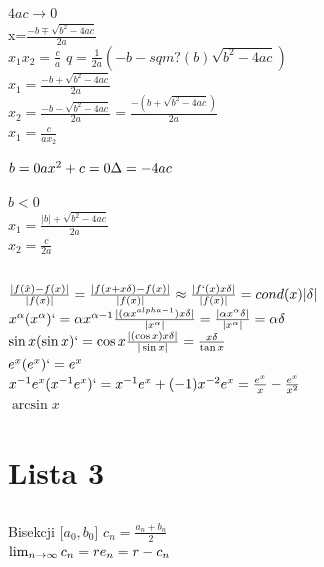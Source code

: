 \documentclass{article}
\begin{document}
    \subsection{}
    $4ac\rightarrow0$\\
    x=$\frac{-b\mp \sqrt{b^{2}-4ac}}{2a}$\\
    $x_{1}x_{2}=\frac{c}{a}$
    $q=\frac{1}{2a}(-b-sqm?(b)\sqrt{b^{2}-4ac})$\\
    $x_{1}=\frac{-b+\sqrt{b^{2}-4ac}}{2a}$\\
    $x_{2}=\frac{-b-\sqrt{b^{2}-4ac}}{2a}=\frac{-(b+\sqrt{b^{2}-4ac})}{2a}$\\
    $x_{1}=\frac{c}{ax_{2}}$\\
    \begin{flushright}
        \parbox{100mm}{
            $b=0    ax^{2}+c=0\\\Delta=-4ac$
        }
    \end{flushright}
    $b< 0 $\\
    $x_{1}=\frac{|b|+\sqrt{b^{2}-4ac}}{2a}$\\
    $x_{2}=\frac{c}{2a}$

    \setcounter{subsection}{7}

    \subsection{}
    $\frac{|f(\hat{x})-f(x)|}{|f(x)|}=\frac{|f(x+x\delta)-f(x)|}{|f(x)|}\approx \frac{|f`(x)x\delta|}{|f(x)|}=cond(x)|\delta|$\\
    $x^{\alpha}   (x^{\alpha})`=\alpha x^{\alpha-1}       \frac{|(\alpha x^{alpha-1})x\delta|}{|x^{\alpha}|}=\frac{|\alpha x^{\alpha}\delta|}{|x^{\alpha}|}=\alpha \delta$\\
    $\sin x (\sin x)`=\cos x      \frac{|(\cos x)x\delta|}{|\sin x|}=\frac{x\delta}{\tan x}$\\
    $e^{x} (e^{x})`=e^{x}$\\
    $x^{-1}e^{x} (x^{-1}e^{x})`=x^{-1}e^{x}+(-1)x^{-2}e^{x}=\frac{e^{x}}{x}-\frac{e^{x}}{x^{2}}$\\
    $\arcsin x$

    \section{Lista 3}

    \subsection{}
    Bisekcji [$a_{0},b_{0}$] $c_{n}=\frac{a_{n}+b_{n}}{2}$\\
    \begin{math}
        \lim_{n \rightarrow \infty} c_{n}=r\\
        e_{n}=r-c_{n}\\
    \end{math}
\end{document}
